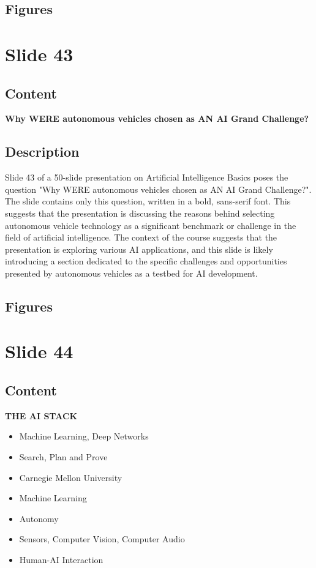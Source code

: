 \documentclass{article}%
\begin{document}
\subsection{Figures}%
\begin{figure}[H]%
\centering%
\end{figure}

%
\newpage%
\section{Slide 43}%
\label{sec:Slide43}%
\subsection{Content}%

\textbf{Why WERE autonomous vehicles chosen as AN AI Grand Challenge?}
%
\subsection{Description}%
Slide 43 of a 50-slide presentation on Artificial Intelligence Basics poses the question "Why WERE autonomous vehicles chosen as AN AI Grand Challenge?".  The slide contains only this question, written in a bold, sans-serif font.  This suggests that the presentation is discussing the reasons behind selecting autonomous vehicle technology as a significant benchmark or challenge in the field of artificial intelligence.  The context of the course suggests that the presentation is exploring various AI applications, and this slide is likely introducing a section dedicated to the specific challenges and opportunities presented by autonomous vehicles as a testbed for AI development.%
\subsection{Figures}%
\begin{figure}[H]%
\centering%
\end{figure}

%
\newpage%
\section{Slide 44}%
\label{sec:Slide44}%
\subsection{Content}%

\textbf{THE AI STACK}

\begin{itemize}
    \item Machine Learning, Deep Networks
    \item Search, Plan and Prove
    \item Carnegie Mellon University
    \item Machine Learning
    \item Autonomy
    \item Sensors, Computer Vision, Computer Audio
    \item Human-AI Interaction
\end{itemize}
%
\end{document}
